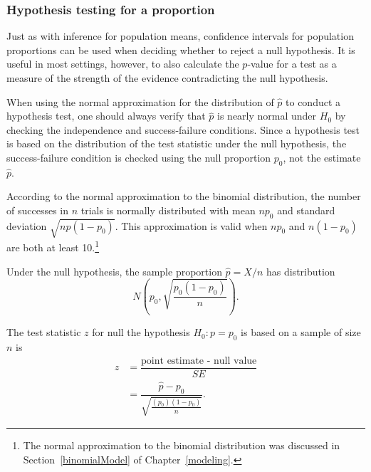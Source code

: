 \subsubsection{Hypothesis testing for a proportion}
\label{htForPropSection}


Just as with inference for population means, confidence intervals for population proportions can be used when deciding whether to reject a null hypothesis. It is useful in most settings, however, to also calculate the $p$-value for a test as a measure of the strength of the evidence contradicting the null hypothesis.

When using the normal approximation for the distribution of $\hat{p}$ to conduct a hypothesis test, one should always verify that $\hat{p}$ is nearly normal under $H_0$ by checking the independence and success-failure conditions. Since a hypothesis test is based on the distribution of the test statistic under the null hypothesis, the success-failure condition is checked using the null proportion $p_0$, not the estimate $\hat{p}$. 

According to the normal approximation to the binomial distribution, the number of successes in $n$ trials is normally distributed with mean $np_0$ and standard deviation $\sqrt{np(1-p_0)}$. This approximation is valid when $np_0$ and $n(1-p_0)$ are both at least 10.\footnote{The normal approximation to the binomial distribution was discussed in Section~\ref{binomialModel} of Chapter~\ref{modeling}.} 

Under the null hypothesis, the sample proportion $\hat{p} = X/n$ has distribution 
\[N \left(p_0, \sqrt{\frac{p_0(1-p_0)}{n}} \right).\]

The test statistic $z$ for null the hypothesis $H_0: p = p_0$ is based on a sample of size $n$ is 
\begin{align*}
  z &= \dfrac{\text{point estimate - null value}}{SE} \\
    &= \dfrac{\hat{p} - p_0}{\sqrt{\frac{(p_0)(1-p_0)}{n}}}. 
\end{align*}

